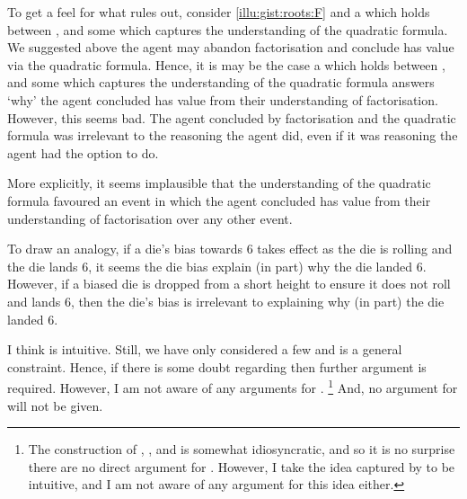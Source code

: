 \begin{note}
  To get a feel for what \issueInclusion{} rules out, consider \autoref{illu:gist:roots:F} and a \ros{} which holds between \propM{\rootsCon{}},  and some \pool{} which captures the \agents{} understanding of the quadratic formula.
  We suggested above the agent may abandon factorisation and conclude \propM{\rootsCon{}} has value  via the quadratic formula.
  Hence, it is may be the case a \ros{} which holds between \propM{\rootsCon{}},  and some \pool{} which captures the \agents{} understanding of the quadratic formula answers `why' the agent concluded \propM{\rootsCon{}} has value  from their understanding of factorisation.
  However, this seems bad.
  The agent concluded by factorisation and the quadratic formula was irrelevant to the reasoning the agent did, even if it was reasoning the agent had the option to do.

  More explicitly, it seems implausible that the \agents{} understanding of the quadratic formula favoured an event in which the agent concluded \propM{\rootsCon{}} has value  from their understanding of factorisation over any other event.

  To draw an analogy, if a die's bias towards \(6\) takes effect as the die is rolling and the die lands \(6\), it seems the die bias explain (in part) why the die landed \(6\).
  However, if a biased die is dropped from a short height to ensure it does not roll and lands \(6\), then the die's bias is irrelevant to explaining why (in part) the die landed \(6\).
\end{note}


\begin{note}
  I think \issueInclusion{} is intuitive.
  Still, we have only considered a few  and \issueInclusion{} is a general constraint.
  Hence, if there is some doubt regarding \issueInclusion{} then further argument is required.
  However, I am not aware of any arguments for \issueInclusion{}.%
  \footnote{
    The construction of \qWhy{}, \qHow{}, and \issueInclusion{} is somewhat idiosyncratic, and so it is no surprise there are no direct argument for \issueInclusion{}.
    However, I take the idea captured by \issueInclusion{} to be intuitive, and I am not aware of any argument for this idea either.
  }
  And, no argument for \issueInclusion{} will not be given.
\end{note}



